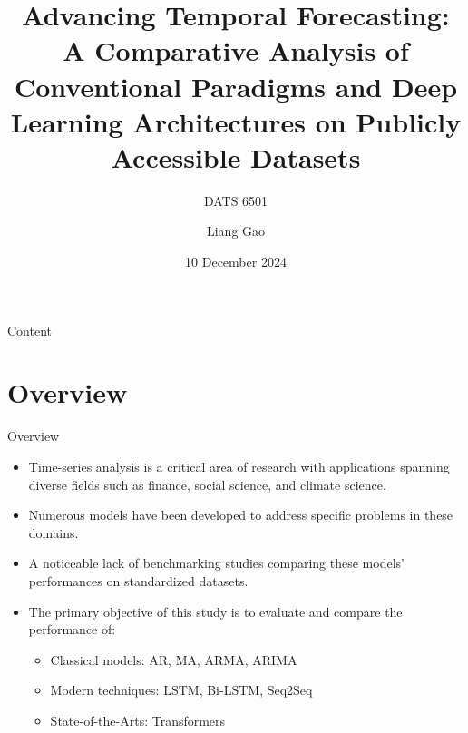 \documentclass[aspectratio=16 9,10pt]{beamer}
\title{Advancing Temporal Forecasting: A Comparative Analysis of Conventional Paradigms and Deep Learning Architectures on Publicly Accessible Datasets}
\subtitle{DATS 6501}
\institute{\textbf{George Washington University}}
\author{Liang Gao}
\date{10 December 2024}
\begin{document}

\begin{frame}
    \titlepage
\end{frame}

\begin{frame}{Content}
\begin{multicols}{2}
    \tableofcontents[hideallsubsections]
\end{multicols}
\end{frame}    
    
\section{Overview}
\begin{frame}{Overview}
    \begin{itemize}
    \item Time-series analysis is a critical area of research with applications spanning diverse
fields such as finance, social science, and climate science.
    \item Numerous models have been developed to address specific problems in these domains.
    \item A noticeable lack of benchmarking studies comparing these models’ performances on standardized datasets.
    \item The primary objective of this study is to evaluate and compare the performance of: 
        \begin{itemize}
        \item Classical models: AR, MA, ARMA, ARIMA
        \item Modern techniques: LSTM, Bi-LSTM, Seq2Seq
        \item State-of-the-Arts: Transformers
        \end{itemize}
    \end{itemize}
\end{frame}
\end{document}
